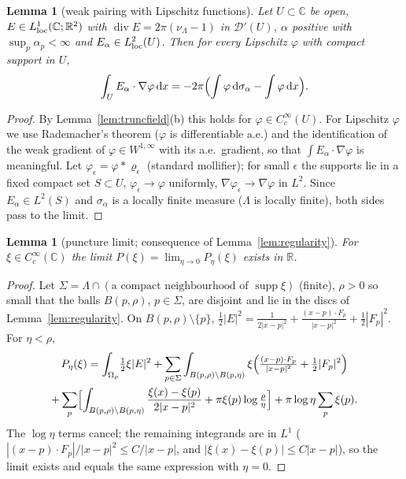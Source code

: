 \documentclass[11pt]{article}
\newtheorem{lemma}[theorem]{Lemma}
\theoremstyle{definition}
\theoremstyle{remark}
\newcommand{\R}{\mathbb R}
\newcommand{\C}{\mathbb C}
\newcommand{\dd}{\,\mathrm d}
\newcommand{\Lam}{\Lambda}
\DeclareMathOperator{\supp}{supp}
\DeclareMathOperator{\Div}{div}
\begin{document}
\begin{lemma}[weak pairing with Lipschitz functions]\label{lem:pairing}
Let $U\subset\C$ be open, $E\in L^1_{\rm loc}(\C;\R^2)$ with $\Div E=2\pi(\nu_\Lam-1)$ in $\mathcal D'(U)$, $\alpha$ positive with $\sup_p\alpha_p<\infty$ and
$E_\alpha\in L^2_{\rm loc}(U)$.  Then for every Lipschitz $\varphi$ with compact support in $U$,
\[
\int_UE_\alpha\cdot\nabla\varphi\dd x=-2\pi\Bigl(\int\varphi\dd\sigma_\alpha-\int\varphi\dd x\Bigr).
\]
\end{lemma}
\begin{proof}
By Lemma~\ref{lem:truncfield}(b) this holds for $\varphi\in C_c^\infty(U)$.  For Lipschitz $\varphi$ we use Rademacher's theorem ($\varphi$ is differentiable a.e.) and the identification of the weak gradient of $\varphi\in W^{1,\infty}$ with its a.e.\ gradient, so that $\int E_\alpha\cdot\nabla\varphi$ is meaningful.  Let
$\varphi_\epsilon=\varphi*\varrho_\epsilon$ (standard mollifier); for small $\epsilon$ the supports lie in a fixed compact set $S\subset U$,
$\varphi_\epsilon\to\varphi$ uniformly, $\nabla\varphi_\epsilon\to\nabla\varphi$ in $L^2$.  Since $E_\alpha\in L^2(S)$ and
$\sigma_\alpha$ is a locally finite measure ($\Lam$ is locally finite), both sides pass to the limit.
\end{proof}

\begin{lemma}[puncture limit; consequence of Lemma~\ref{lem:regularity}]\label{lem:punct-limit}
For $\xi\in C_c^\infty(\C)$ the limit $P(\xi)=\lim_{\eta\to0}P_\eta(\xi)$ exists in $\R$.
\end{lemma}
\begin{proof}
Let $\Sigma=\Lam\cap(\text{a compact neighbourhood of }\supp\xi)$ (finite), $\rho>0$ so small that the balls $B(p,\rho)$,
$p\in\Sigma$, are disjoint and lie in the discs of Lemma~\ref{lem:regularity}.  On $B(p,\rho)\setminus\{p\}$,
$\frac12|E|^2=\frac1{2|x-p|^2}+\frac{(x-p)\cdot F_p}{|x-p|^2}+\frac12|F_p|^2$.  For $\eta<\rho$,
\begin{multline*}
P_\eta(\xi)=\int_{\Omega_\rho}\!\tfrac12\xi|E|^2+\sum_{p\in\Sigma}\int_{B(p,\rho)\setminus B(p,\eta)}\xi\Bigl(\tfrac{(x-p)\cdot F_p}{|x-p|^2}+\tfrac12|F_p|^2\Bigr)\\
+\sum_p\Bigl[\int_{B(p,\rho)\setminus B(p,\eta)}\frac{\xi(x)-\xi(p)}{2|x-p|^2}+\pi\xi(p)\log\tfrac\rho\eta\Bigr]+\pi\log\eta\sum_p\xi(p).
\end{multline*}
The $\log\eta$ terms cancel; the remaining integrands are in $L^1$ ($|(x-p)\cdot F_p|/|x-p|^2\le C/|x-p|$, and
$|\xi(x)-\xi(p)|\le C|x-p|$), so the limit exists and equals the same expression with $\eta=0$.
\end{proof}
\end{document}

